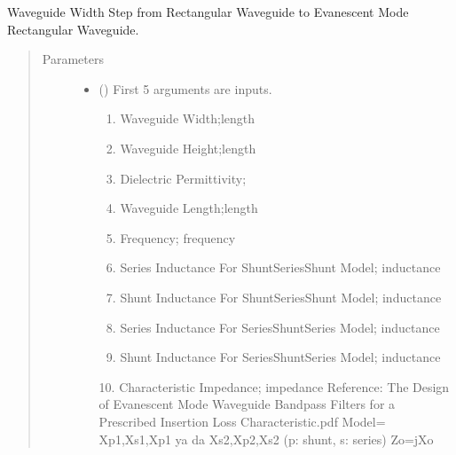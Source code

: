 \documentclass[letterpaper,10pt,english]{sphinxmanual}
\begin{document}
\begin{fulllineitems}
\label{\detokenize{components:components.EvanescentWGEquivalent}}
Waveguide Width Step from Rectangular Waveguide to Evanescent Mode Rectangular Waveguide.
\begin{quote}\begin{description}
\item[{Parameters}] \leavevmode\begin{itemize}
\item {} 
 () \textendash{} 
First 5 arguments are inputs.
\begin{enumerate}
%
\item {} 
Waveguide Width;length

\item {} 
Waveguide Height;length

\item {} 
Dielectric Permittivity;

\item {} 
Waveguide Length;length

\item {} 
Frequency; frequency

\item {} 
Series Inductance For Shunt\sphinxhyphen{}Series\sphinxhyphen{}Shunt Model; inductance

\item {} 
Shunt Inductance For Shunt\sphinxhyphen{}Series\sphinxhyphen{}Shunt Model; inductance

\item {} 
Series Inductance For Series\sphinxhyphen{}Shunt\sphinxhyphen{}Series Model; inductance

\item {} 
Shunt Inductance For Series\sphinxhyphen{}Shunt\sphinxhyphen{}Series Model; inductance

\end{enumerate}

10. Characteristic Impedance; impedance
Reference:  The Design of Evanescent Mode Waveguide Bandpass Filters for a Prescribed Insertion Loss Characteristic.pdf
Model= Xp1,Xs1,Xp1 ya da Xs2,Xp2,Xs2 (p: shunt, s: series)
Zo=jXo



\end{itemize}
\end{description}
\end{quote}
\end{fulllineitems}
\end{document}
